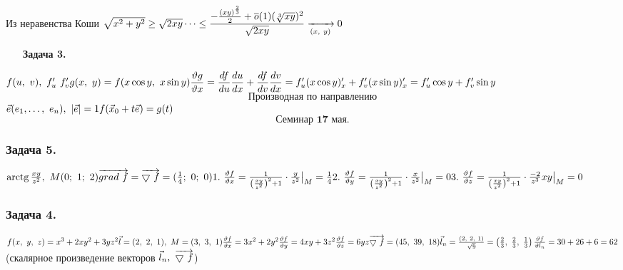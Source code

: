 \documentclass[12pt, letterpaper, twoside]{article}
\newcommand{\arctg}{\operatorname{arctg}}
\newcommand{\Abs}[1]{\left| #1 \right|}
\begin{document}
    Из неравенства Коши $\sqrt{x^2 + y^2} \geq \sqrt{2xy}\\
    \dots \leq \dfrac{-\frac{(xy)^{\frac{2}{3}}}{2} + \overline{o}(1)(\sqrt[3]{xy})^2}{\sqrt{2xy}} \xrightarrow[(x,\ y)]{} 0$
    \begin{enumerate}
        \item[\textbf{Задача 3.}]
    \end{enumerate}
    $f(u,\ v),\ f_u'\ f'_v\\
    g(x,\ y) = f(x\cos y,\ x\sin y)\\
    \dfrac{\vartheta g}{\vartheta x} = \dfrac{df}{du}\dfrac{du}{dx} + \dfrac{df}{dv}\dfrac{dv}{dx} = f'_u(x\cos y)'_x + f'_v (x\sin y)'_x = f'_u \cos y + f'_v \sin y$\\
    \[\text{Производная по направлению}\]
    $\vec{e}(e_1,\dots,\ e_n),\ \Abs{\vec{e}} = 1\\
    f(\vec{x}_0 + t\vec{e}) = g(t)$
    \[\textbf{Семинар 17 мая.}\]
    \subsubsection*{Задача 5.}
    $\arctg \frac{xy}{z^2},\ M(0;\ 1;\ 2)\\
    \overrightarrow{grad\ f} = \overrightarrow{\varbigtriangledown\ f} = (\frac{1}{4};\ 0;\ 0)\\
    1.\ \frac{\vartheta f}{\vartheta x} = \frac{1}{\left(\frac{xy}{z^2}\right)^2 + 1}\cdot \frac{y}{z^2}\big|_{M} = \frac{1}{4}\\
    2.\ \frac{\vartheta f}{\vartheta y} = \frac{1}{\left(\frac{xy}{z^2}\right)^2 + 1}\cdot \frac{x}{z^2}\big|_{M} = 0\\
    3.\ \frac{\vartheta f}{\vartheta z} = \frac{1}{\left(\frac{xy}{z^2}\right)^2 + 1}\cdot \frac{-2}{z^3}xy\big|_{M} = 0$
    \subsubsection*{Задача 4.}
    $f(x,\ y,\ z) = x^3 + 2xy^2 + 3yz^2\\
    \vec{l} = (2,\ 2,\ 1),\ M = (3,\ 3,\ 1)\\
    \frac{\vartheta f}{\vartheta x} = 3x^2 + 2y^2\\
    \frac{\vartheta f}{\vartheta y} = 4xy + 3z^2\\
    \frac{\vartheta f}{\vartheta z} = 6yz\\
    \overrightarrow{\varbigtriangledown\ f} = (45,\ 39,\ 18)\\
    \vec{l}_n = \frac{(2,\ 2,\ 1)}{\sqrt{9}} = \left(\frac{2}{3},\ \frac{2}{3},\ \frac{1}{3}\right)\\
    \frac{\vartheta f}{\vartheta l_n} = 30 + 26 + 6 = 62$ (скалярное произведение векторов $\vec{l}_n,\ \overrightarrow{\varbigtriangledown\ f}$)\\
\end{document}
